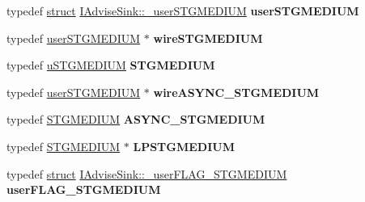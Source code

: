 \begin{DoxyCompactItemize}
\item 
\mbox{\label{interface_i_advise_sink_a2d5839f50fc25b9ae9795294fbc15580}} 
typedef \hyperlink{interfacestruct}{struct} \hyperlink{struct_i_advise_sink_1_1__user_s_t_g_m_e_d_i_u_m}{I\+Advise\+Sink\+::\+\_\+user\+S\+T\+G\+M\+E\+D\+I\+UM} {\bfseries user\+S\+T\+G\+M\+E\+D\+I\+UM}
\item 
\mbox{\label{interface_i_advise_sink_aadfaaac9affe31a2ce52fa20584e71ed}} 
typedef \hyperlink{struct_i_advise_sink_1_1__user_s_t_g_m_e_d_i_u_m}{user\+S\+T\+G\+M\+E\+D\+I\+UM} $\ast$ {\bfseries wire\+S\+T\+G\+M\+E\+D\+I\+UM}
\item 
\mbox{\label{interface_i_advise_sink_a91f488778e60d576bf680070a19b9ff3}} 
typedef \hyperlink{struct_i_advise_sink_1_1tag_s_t_g_m_e_d_i_u_m}{u\+S\+T\+G\+M\+E\+D\+I\+UM} {\bfseries S\+T\+G\+M\+E\+D\+I\+UM}
\item 
\mbox{\label{interface_i_advise_sink_a5b2d65567cdbfaadd890cb5a5b17a4b3}} 
typedef \hyperlink{struct_i_advise_sink_1_1__user_s_t_g_m_e_d_i_u_m}{user\+S\+T\+G\+M\+E\+D\+I\+UM} $\ast$ {\bfseries wire\+A\+S\+Y\+N\+C\+\_\+\+S\+T\+G\+M\+E\+D\+I\+UM}
\item 
\mbox{\label{interface_i_advise_sink_adc625fd3b49f5b5dc4595465c16e4540}} 
typedef \hyperlink{struct_i_advise_sink_1_1tag_s_t_g_m_e_d_i_u_m}{S\+T\+G\+M\+E\+D\+I\+UM} {\bfseries A\+S\+Y\+N\+C\+\_\+\+S\+T\+G\+M\+E\+D\+I\+UM}
\item 
\mbox{\label{interface_i_advise_sink_acc77d43a57f20aafc1fae17d2021441c}} 
typedef \hyperlink{struct_i_advise_sink_1_1tag_s_t_g_m_e_d_i_u_m}{S\+T\+G\+M\+E\+D\+I\+UM} $\ast$ {\bfseries L\+P\+S\+T\+G\+M\+E\+D\+I\+UM}
\item 
\mbox{\label{interface_i_advise_sink_ac218a45908036cbd45c401c806c328e4}} 
typedef \hyperlink{interfacestruct}{struct} \hyperlink{struct_i_advise_sink_1_1__user_f_l_a_g___s_t_g_m_e_d_i_u_m}{I\+Advise\+Sink\+::\+\_\+user\+F\+L\+A\+G\+\_\+\+S\+T\+G\+M\+E\+D\+I\+UM} {\bfseries user\+F\+L\+A\+G\+\_\+\+S\+T\+G\+M\+E\+D\+I\+UM}
\item 
\mbox{\label{interface_i_advise_sink_aeab7444f09f346b2c2e3ae3b29b99dd3}} 

\end{DoxyCompactItemize}
